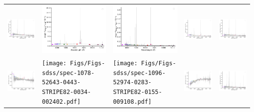 \begin{center}
\begin{longtable}{l l l l l }
    \includegraphics[width=0.19\linewidth, clip]{Figs/Figs-sdss/spec-1068-52614-0500-STRIPE82-0064-029944.pdf} & \includegraphics[width=0.19\linewidth, clip]{Figs/Figs-sdss/spec-1069-52590-0193-STRIPE82-0059-041056.pdf} & \includegraphics[width=0.19\linewidth, clip]{Figs/Figs-sdss/spec-1071-52641-0013-STRIPE82-0057-050992.pdf} & \includegraphics[width=0.19\linewidth, clip]{Figs/Figs-sdss/spec-1071-52641-0266-STRIPE82-0053-009717.pdf} & \includegraphics[width=0.19\linewidth, clip]{Figs/Figs-sdss/spec-1071-52641-0358-STRIPE82-0054-042573.pdf} \\
    \includegraphics[width=0.19\linewidth, clip]{Figs/Figs-sdss/spec-1073-52649-0091-STRIPE82-0049-021805.pdf} & \texttt{[image: Figs/Figs-sdss/spec-1078-52643-0443-STRIPE82-0034-002402.pdf]} & \texttt{[image: Figs/Figs-sdss/spec-1096-52974-0283-STRIPE82-0155-009108.pdf]} & \includegraphics[width=0.19\linewidth, clip]{Figs/Figs-sdss/spec-1101-52621-0223-SPLUS-s02s12-030410.pdf} & \includegraphics[width=0.19\linewidth, clip]{Figs/Figs-sdss/spec-1102-52883-0155-STRIPE82-0139-036676.pdf} \\

\end{longtable}
\end{center}
